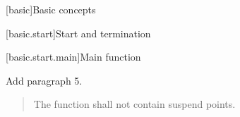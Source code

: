 
\setcounter{chapter}{2}
[basic]{Basic concepts}

\setcounter{section}{5}
[basic.start]{Start and termination}

[basic.start.main]{Main function}

Add paragraph 5.

\begin{quote}
	\setcounter{Paras}{4}
	\pnum
	The function  shall not contain suspend points.
\end{quote}

